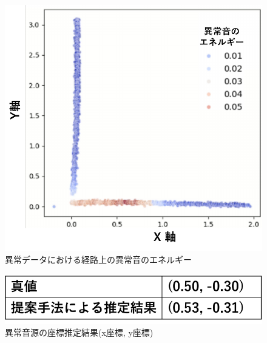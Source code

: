 \documentclass[../main]{subfiles}
\begin{document}
\begin{figure}[tb]
  \centering
  \includegraphics[keepaspectratio, width=0.8\linewidth]{energy_abnormal.pdf}
  \caption{異常データにおける経路上の異常音のエネルギー}
\end{figure}

\begin{figure}[tb]
  \centering
  \includegraphics[keepaspectratio, width=0.8\linewidth]{result.pdf}
  \caption{異常音源の座標推定結果(x座標, y座標)}
\end{figure}
\end{document}
